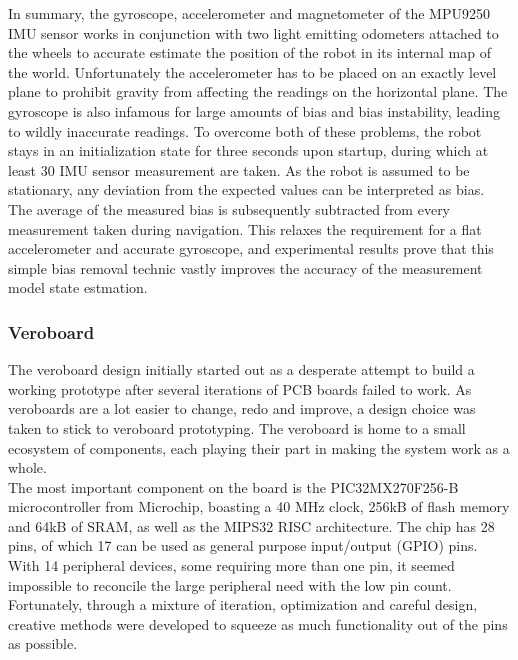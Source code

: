 In summary, the gyroscope, accelerometer and magnetometer of the MPU9250 IMU sensor works in conjunction with two light emitting odometers attached to the wheels to accurate estimate the position of the robot in its internal map of the world. Unfortunately the accelerometer has to be placed on an exactly level plane to prohibit gravity from affecting the readings on the horizontal plane. The gyroscope is also infamous for large amounts of bias and bias instability, leading to wildly inaccurate readings. To overcome both of these problems, the robot stays in an initialization state for three seconds upon startup, during which at least 30 IMU sensor measurement are taken. As the robot is assumed to be stationary, any deviation from the expected values can be interpreted as bias. The average of the measured bias is subsequently subtracted from every measurement taken during navigation. This relaxes the requirement for a flat accelerometer and accurate gyroscope, and experimental results prove that this simple bias removal technic vastly improves the accuracy of the measurement model state estmation.

\subsubsection{Veroboard}
\label{sec:veroboard}

The veroboard design initially started out as a desperate attempt to build a working prototype after several iterations of PCB boards failed to work. As veroboards are a lot easier to change, redo and improve, a design choice was taken to stick to veroboard prototyping. The veroboard is home to a small ecosystem of components, each playing their part in making the system work as a whole. \\

The most important component on the board is the PIC32MX270F256-B microcontroller from Microchip, boasting a 40 MHz clock, 256kB of flash memory and 64kB of SRAM, as well as the MIPS32 RISC architecture. The chip has 28 pins, of which 17 can be used as general purpose input/output (GPIO) pins. With 14 peripheral devices, some requiring more than one pin, it seemed impossible to reconcile the large peripheral need with the low pin count. Fortunately, through a mixture of iteration, optimization and careful design, creative methods were developed to squeeze as much functionality out of the pins as possible. \\

